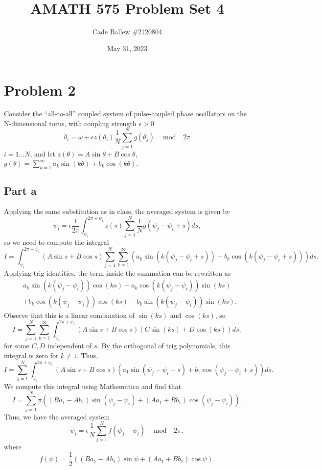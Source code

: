 \documentclass{article}
\title{AMATH 575 Problem Set 4}
\author{Cade Ballew \#2120804}
\date{May 31, 2023}
\begin{document}
	
\maketitle

\section{Problem 2}
Consider the ``all-to-all'' coupled system of pulse-coupled phase oscillators on the N-dimensional torus, with coupling strength $\epsilon>0$
\begin{equation*}
	\dot \theta_i = \omega + \epsilon z(\theta_i) \frac{1}{N} \sum_{j=1}^N g(\theta_j) \, \, \,  \mod \; \; 2 \pi  
\end{equation*}
$i=1...N$, and let $z(\theta)=A \sin \theta + B \cos \theta $, $g(\theta) = \sum_{k=1}^\infty a_k \sin(k \theta) + b_k \cos(k \theta)$.

\subsection{Part a}
Applying the same substitution as in class, the averaged system is given by
\[
\dot\psi_i=\epsilon\frac{1}{2\pi}\int_{\psi_i}^{2\pi+\psi_i}z(s)\sum_{j=1}^N\frac{1}{N}g(\psi_j-\psi_i+s)ds,
\]
so we need to compute the integral
\[
I=\int_{\psi_i}^{2\pi+\psi_i}(A \sin s + B \cos s)\sum_{j=1}^N\sum_{k=1}^\infty (a_k \sin(k (\psi_j-\psi_i+s)) + b_k \cos(k (\psi_j-\psi_i+s)))ds.
\]
Applying trig identities, the term inside the summation can be rewritten as
\begin{align*}
&a_k\sin(k (\psi_j-\psi_i))\cos(ks)+a_k\cos(k (\psi_j-\psi_i))\sin(ks)\\&+b_k\cos(k (\psi_j-\psi_i))\cos(ks)-b_k\sin(k (\psi_j-\psi_i))\sin(ks).
\end{align*}
Observe that this is a linear combination of $\sin(ks)$ and $\cos(ks)$, so 
\[
I=\sum_{j=1}^N\sum_{k=1}^\infty\int_{\psi_i}^{2\pi+\psi_i}(A \sin s + B \cos s)(C \sin(ks) + D \cos(ks))ds,
\] 
for some $C,D$ independent of $s$. By the orthogonal of trig polynomials, this integral is zero for $k\neq1$. Thus,
\[
I=\sum_{j=1}^N\int_{\psi_i}^{2\pi+\psi_i}(A \sin s + B \cos s) (a_1 \sin( \psi_j-\psi_i+s) + b_1 \cos(\psi_j-\psi_i+s))ds.
\]
We compute this integral using Mathematica and find that
\[
I=\sum_{j=1}^N\pi\left((Ba_1-Ab_1)\sin(\psi_j-\psi_i)+(Aa_1+Bb_1)\cos(\psi_j-\psi_i)\right).
\]
Thus, we have the averaged system 
 \begin{equation*}
	\dot \psi_i =  \epsilon  \frac{1}{N} \sum_{j=1}^N f(\psi_j - \psi_i) \, \, \,  \mod \; \; 2 \pi, 
\end{equation*} 
where 
\[
f(\psi)=\frac{1}{2}\left((Ba_1-Ab_1)\sin\psi+(Aa_1+Bb_1)\cos\psi\right).
\]
\end{document}
